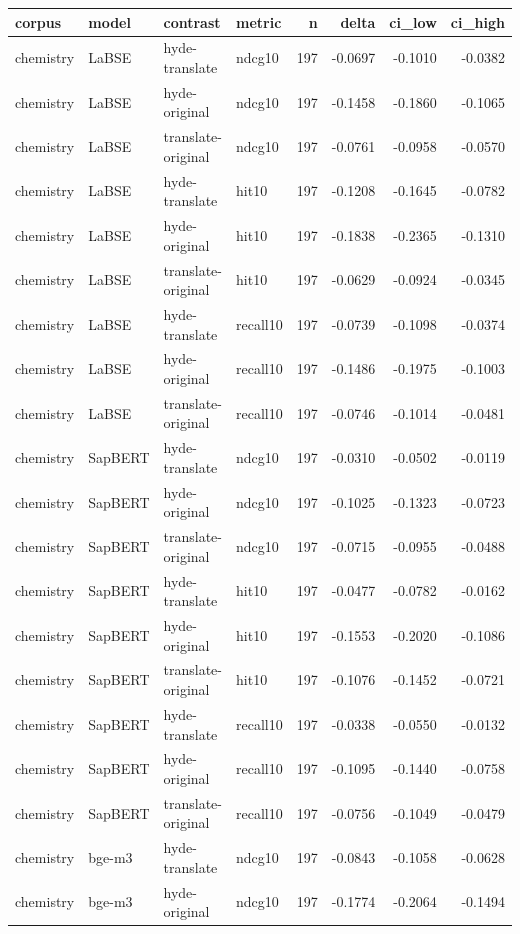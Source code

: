 \begin{tabular}{llllrrrr}
\toprule
corpus & model & contrast & metric & n & delta & ci\_low & ci\_high \\
\midrule
chemistry & LaBSE & hyde-translate & ndcg10 & 197 & -0.0697 & -0.1010 & -0.0382 \\
chemistry & LaBSE & hyde-original & ndcg10 & 197 & -0.1458 & -0.1860 & -0.1065 \\
chemistry & LaBSE & translate-original & ndcg10 & 197 & -0.0761 & -0.0958 & -0.0570 \\
chemistry & LaBSE & hyde-translate & hit10 & 197 & -0.1208 & -0.1645 & -0.0782 \\
chemistry & LaBSE & hyde-original & hit10 & 197 & -0.1838 & -0.2365 & -0.1310 \\
chemistry & LaBSE & translate-original & hit10 & 197 & -0.0629 & -0.0924 & -0.0345 \\
chemistry & LaBSE & hyde-translate & recall10 & 197 & -0.0739 & -0.1098 & -0.0374 \\
chemistry & LaBSE & hyde-original & recall10 & 197 & -0.1486 & -0.1975 & -0.1003 \\
chemistry & LaBSE & translate-original & recall10 & 197 & -0.0746 & -0.1014 & -0.0481 \\
chemistry & SapBERT & hyde-translate & ndcg10 & 197 & -0.0310 & -0.0502 & -0.0119 \\
chemistry & SapBERT & hyde-original & ndcg10 & 197 & -0.1025 & -0.1323 & -0.0723 \\
chemistry & SapBERT & translate-original & ndcg10 & 197 & -0.0715 & -0.0955 & -0.0488 \\
chemistry & SapBERT & hyde-translate & hit10 & 197 & -0.0477 & -0.0782 & -0.0162 \\
chemistry & SapBERT & hyde-original & hit10 & 197 & -0.1553 & -0.2020 & -0.1086 \\
chemistry & SapBERT & translate-original & hit10 & 197 & -0.1076 & -0.1452 & -0.0721 \\
chemistry & SapBERT & hyde-translate & recall10 & 197 & -0.0338 & -0.0550 & -0.0132 \\
chemistry & SapBERT & hyde-original & recall10 & 197 & -0.1095 & -0.1440 & -0.0758 \\
chemistry & SapBERT & translate-original & recall10 & 197 & -0.0756 & -0.1049 & -0.0479 \\
chemistry & bge-m3 & hyde-translate & ndcg10 & 197 & -0.0843 & -0.1058 & -0.0628 \\
chemistry & bge-m3 & hyde-original & ndcg10 & 197 & -0.1774 & -0.2064 & -0.1494 \\

\end{tabular}
